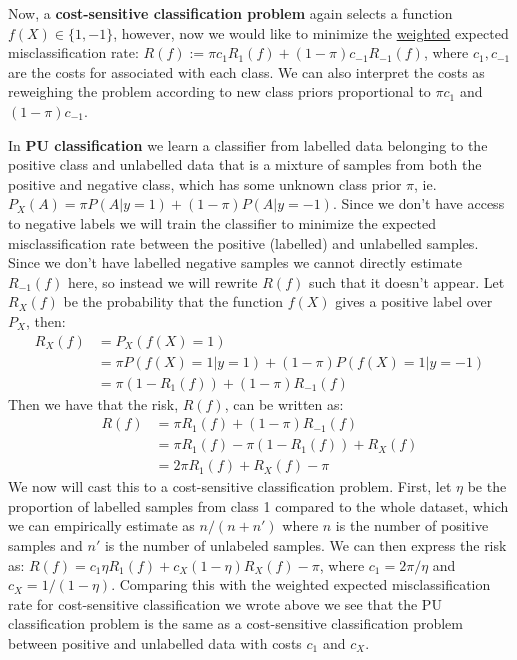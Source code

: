 Now, a \textbf{cost-sensitive classification problem} again selects a function $f(X) \in \{1,-1\}$, however, now we would like to minimize the \underline{weighted} expected misclassification rate: $R(f) := \pi c_{1} R_{1}(f) + (1- \pi) c_{-1} R_{-1}(f)$, where $c_{1}, c_{-1}$ are the costs for associated with each class. We can also interpret the costs as reweighing the problem according to new class priors proportional to $\pi c_{1}$ and $(1- \pi) c_{-1}$. 

In \textbf{PU classification} we learn a classifier from labelled data belonging to the positive class and unlabelled data that is a mixture of samples from both the positive and negative class, which has some unknown class prior $\pi$, ie. $P_{X}(A) = \pi P(A | y=1) + (1-\pi) P(A | y=-1)$. Since we don't have access to negative labels we will train the classifier to minimize the expected misclassification rate between the positive (labelled) and unlabelled samples. Since we don't have labelled negative samples we cannot directly estimate $R_{-1}(f)$ here, so instead we will rewrite $R(f)$ such that it doesn't appear. Let $R_{X}(f)$ be the probability that the function $f(X)$ gives a positive label over $P_{X}$, then: 
\begin{align}
    R_{X}(f) &{} = P_{X}(f(X)=1) \\
    &= \pi P(f(X)=1 |y=1) + (1- \pi) P(f(X)=1 | y=-1) \\
    &= \pi (1-R_{1}(f)) + (1- \pi) R_{-1}(f)
\end{align}
Then we have that the risk, $R(f)$, can be written as:
\begin{align}
    R(f) &{}= \pi R_{1}(f) + (1-\pi)R_{-1}(f) \\
    &= \pi R_{1}(f) - \pi (1-R_{1}(f)) + R_{X}(f)  \\
    &= 2 \pi R_{1}(f) + R_{X}(f) -\pi
\end{align} 
We now will cast this to a cost-sensitive classification problem. First, let $\eta$ be the proportion of labelled samples from class 1 compared to the whole dataset, which we can empirically estimate as $n / (n+n')$ where $n$ is the number of positive samples and $n'$ is the number of unlabeled samples. We can then express the risk as: $R(f) = c_{1} \eta R_{1}(f) +c_{X}(1- \eta) R_{X}(f) - \pi$, where $c_{1} = 2 \pi / \eta$ and $c_{X} = 1/ (1- \eta)$. Comparing this with the weighted expected misclassification rate for cost-sensitive classification we wrote above we see that the PU classification problem is the same as a cost-sensitive classification problem between positive and unlabelled data with costs $c_{1}$ and $c_{X}$. 

